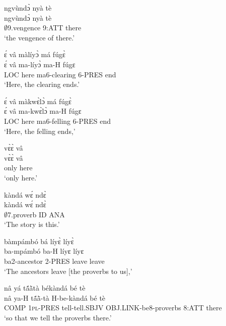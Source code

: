 \begin{exe} 
\exN\label{245}
  \glll ngvùndɔ̀ nyà tè \\
       ngvùndɔ̀ nyà tè \\
        $\emptyset$9.vengence 9:ATT there  \\
    \trans `the vengence of there.'
\end{exe}

\begin{exe} 
\exN\label{246}
  \glll ɛ́ vâ màlíyɔ̀ má fúgɛ̀ \\
       ɛ́ vâ ma-líyɔ̀ ma-H fúgɛ \\
         LOC here ma6-clearing 6-PRES end \\
    \trans `Here, the clearing ends.'
\end{exe}

\begin{exe} 
\exN\label{247}
  \glll ɛ́ vâ màkwɛ̀lɔ̀ má fúgɛ̀ \\
         ɛ́ vâ ma-kwɛ̀lɔ̀ ma-H fúgɛ \\
         LOC here ma6-felling 6-PRES end \\
    \trans `Here, the felling ends,'
\end{exe}

\begin{exe} 
\exN\label{248}
  \glll vɛ̀ɛ̀ vâ \\
        vɛ̀ɛ̀ vâ \\
       only here   \\
    \trans `only here.'
\end{exe}

\begin{exe} 
\exN\label{249}
  \glll kàndá wɛ́ ndɛ̀ \\
        kàndá wɛ́ ndɛ̀ \\
        $\emptyset$7.proverb ID ANA  \\
    \trans `The story is this.'
\end{exe}

\begin{exe} 
\exN\label{250}
  \glll bàmpámbó bá líyɛ̀ líyɛ̀ \\
       ba-mpámbó ba-H líyɛ líyɛ \\
         ba2-ancestor 2-PRES leave leave \\ 
    \trans `The ancestors leave [the proverbs to us],'
\end{exe}

\begin{exe} 
\exN\label{251}
  \glll nâ yá tã́ã̀tà békàndá bé tè \\
        nâ ya-H tã́ã̀-tà H-be-kàndá bé tè \\
        COMP 1\textsc{pl}-PRES tell-tell.SBJV OBJ.LINK-be8-proverbs 8:ATT there  \\
    \trans `so that we tell the proverbs there.'
\end{exe}

